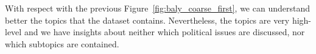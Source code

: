 With respect with the previous Figure~\ref{fig:baly_coarse_first}, we can understand better the topics that the dataset contains.
Nevertheless, the topics are very high-level and we have insights about neither which political issues are discussed, nor which subtopics are contained.











